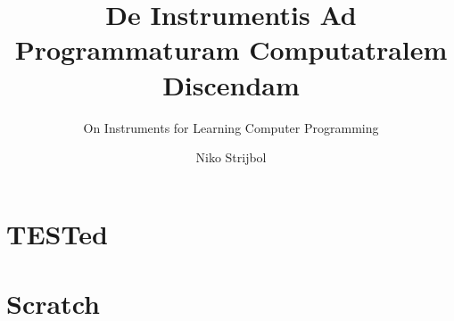 \documentclass[
    paper=240mm:170mm,
    paper=portrait,
    parskip=half,
    cleardoublepage=plain,
    toc=chapterentrywithdots,
    chapterprefix=true,
    captions=tableheading,
    fontsize=10pt,
    mpinclude=true,
    DIV=13,
    BCOR=10mm
]{scrbook}
\author{Niko Strijbol}
\title{De Instrumentis Ad Programmaturam Computatralem Discendam}
\subtitle{On Instruments for Learning Computer Programming}
\newcommand{\tested}{TESTed}
\begin{document}
\frontmatter

{
    \selectfont\panno
    \maketitle
}



\tableofcontents





\mainmatter

\part{\tested{}}\label{part:tested}




\part{Scratch}\label{part:scratch}






\printbibliography[heading=bibintoc]
\end{document}
